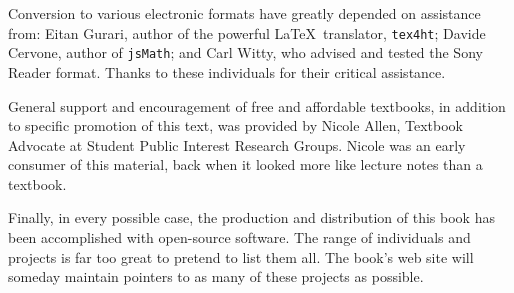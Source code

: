 %
Conversion to various electronic formats have greatly depended on assistance from:  Eitan Gurari, author of the powerful \LaTeX\ translator, {\tt tex4ht}; Davide Cervone, author of {\tt jsMath}; and Carl Witty, who advised and tested the Sony Reader format.  Thanks to these individuals for their critical assistance.\par
%
General support and encouragement of free and affordable textbooks, in addition to specific promotion of this text, was provided by Nicole Allen, Textbook Advocate at Student Public Interest Research Groups.  Nicole was an early consumer of this material, back when it looked more like lecture notes than a textbook.\par
%
Finally, in every possible case, the production and distribution of this book has been accomplished with open-source software.  The range of individuals and projects is far too great to pretend to list them all.  The book's web site will someday maintain pointers to as many of these projects as possible.